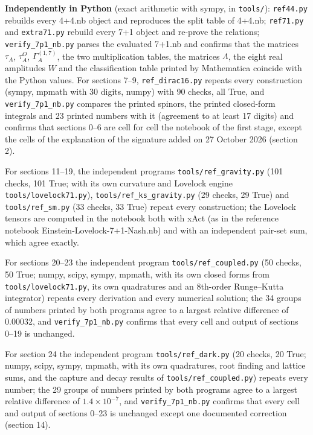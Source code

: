 \documentclass[10pt,a4paper]{article}
\begin{document}
\textbf{Independently in Python} (exact arithmetic with sympy, in \texttt{tools/\allowbreak{}}): \texttt{ref44.py} rebuilds every 4+4.nb object and reproduces the split table of 4+4.nb; \texttt{ref71.py} and \texttt{extra71.py} rebuild every 7+1 object and re-prove the relations; \texttt{verify\_\allowbreak{}7p1\_\allowbreak{}nb.py} parses the evaluated 7+1.nb and confirms that the matrices $\tau_A$, $\tau^{O}_A$, $\Gamma^{(1,7)}_A$, the two multiplication tables, the matrices $\Lambda$, the eight real amplitudes $W$ and the classification table printed by Mathematica coincide with the Python values. For sections 7–9, \texttt{ref\_\allowbreak{}dirac16.py} repeats every construction (sympy, mpmath with 30 digits, numpy) with 90 checks, all True, and \texttt{verify\_\allowbreak{}7p1\_\allowbreak{}nb.py} compares the printed spinors, the printed closed-form integrals and 23 printed numbers with it (agreement to at least 17 digits) and confirms that sections 0–6 are cell for cell the notebook of the first stage, except the cells of the explanation of the signature added on 27 October 2026 (section 2).

For sections 11–19, the independent programs \texttt{tools/\allowbreak{}ref\_\allowbreak{}gravity.py} (101 checks, 101 True; with its own curvature and Lovelock engine \texttt{tools/\allowbreak{}lovelock71.py}), \texttt{tools/\allowbreak{}ref\_\allowbreak{}ks\_\allowbreak{}gravity.py} (29 checks, 29 True) and \texttt{tools/\allowbreak{}ref\_\allowbreak{}sm.py} (33 checks, 33 True) repeat every construction; the Lovelock tensors are computed in the notebook both with xAct (as in the reference notebook Einstein-Lovelock-7+1-Nash.nb) and with an independent pair-set sum, which agree exactly.

For sections 20–23 the independent program \texttt{tools/\allowbreak{}ref\_\allowbreak{}coupled.py} (50 checks, 50 True; numpy, scipy, sympy, mpmath, with its own closed forms from \texttt{tools/\allowbreak{}lovelock71.py}, its own quadratures and an 8th-order Runge–Kutta integrator) repeats every derivation and every numerical solution; the 34 groups of numbers printed by both programs agree to a largest relative difference of 0.00032, and \texttt{verify\_\allowbreak{}7p1\_\allowbreak{}nb.py} confirms that every cell and output of sections 0–19 is unchanged.

For section 24 the independent program \texttt{tools/\allowbreak{}ref\_\allowbreak{}dark.py} (20 checks, 20 True; numpy, scipy, sympy, mpmath, with its own quadratures, root finding and lattice sums, and the capture and decay results of \texttt{tools/\allowbreak{}ref\_\allowbreak{}coupled.py}) repeats every number; the 29 groups of numbers printed by both programs agree to a largest relative difference of $1.4\times10^{-7}$, and \texttt{verify\_\allowbreak{}7p1\_\allowbreak{}nb.py} confirms that every cell and output of sections 0–23 is unchanged except one documented correction (section 14).
\end{document}
